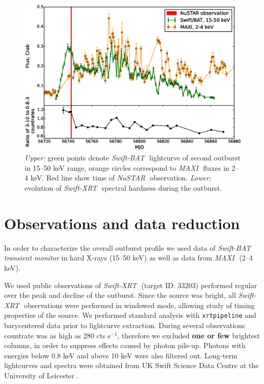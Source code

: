 \documentclass[a4paper,fleqn,usenatbib]{mnras}
\def\swiftx{{\em Swift-XRT\,}}
\def\swiftb{{\em Swift-BAT\,}}
\def\nustar{{\em NuSTAR\,}}
\def\maxi{{\em MAXI\,}}
\begin{document}
\begin{figure}
\centerline{\includegraphics[scale=0.5]{batlc_v06.eps}}
\caption{{\it Upper:} green points denote \swiftb\, lightcurve of second outburst in 15--50 keV range, orange circles correspond to \maxi\, fluxes in 2--4 keV. Red line show time of \nustar\, observation. {\it Lower:} evolution of \swiftx\, spectral hardness during the outburst.} 
\label{fig:batlc}
\end{figure} 

\section{Observations and data reduction}
\label{sec:datared} 
In order to characterize the overall outburst profile we used data of \swiftb\, {\it transient monitor} \citep{krimm13bat} in hard X-rays (15--50 keV) as well as data from \maxi\, \citep{matsuoka13maxi} (2--4 keV).

We used public observations of \swiftx\, (target ID: 33203) performed regular over the peak and decline of the outburst.  
Since the source was bright, all \swiftx\, observations were performed in windowed mode, allowing study of timing properties of the source. 
We performed standard analysis with {\texttt{xrtpipeline}} and barycentered data prior to lightcurve extraction. 
During several observations countrate was as high as 280 cts s$^{-1}$, therefore we excluded {\bf one or few} brightest columns, in order to suppress effects caused by photon pile-up. 
Photons with energies below 0.8 keV and above 10 keV were also filtered out. 
Long-term lightcurves and spectra were obtained from UK Swift Science Data Centre at the University of Leicester \citep{evans09}.
\end{document}
